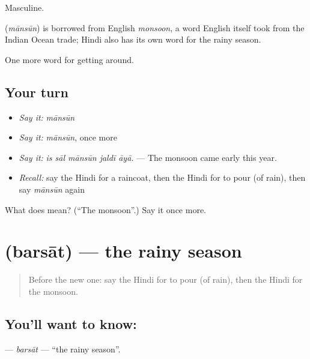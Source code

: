 Masculine.

\begin{cousinweb}
\textbf{} (\emph{mānsūn}) is borrowed from English \emph{monsoon}, a word English itself took from the Indian Ocean trade; Hindi also has its own word for the rainy season.
\end{cousinweb}

\begin{grammarlens}[title={What you've built}]
One more word for getting around.
\end{grammarlens}

\subsection*{Your turn}
\begin{itemize}
\raggedright
  \item \emph{Say it:} \emph{mānsūn}
  \item \emph{Say it:} \emph{mānsūn}, once more
  \item \emph{Say it:} \emph{is sāl mānsūn jaldī āyā.} — The monsoon came early this year.
  \item \emph{Recall:} say the Hindi for a raincoat, then the Hindi for to pour (of rain), then say \emph{mānsūn} again
\end{itemize}

\begin{tcolorbox}[breakable,colback=teal!4,colframe=teal!35!black,title={Before you move on}]
What does  mean? (\textquotedblleft{}The monsoon\textquotedblright{}.) Say it once more.
\end{tcolorbox}
\section[\texorpdfstring{\hi{बरसात} (barsāt)}{बरसात (barsāt)}]{ (barsāt) — the rainy season}

\label{lesson:HI-C437-barsat}



\begin{quote}
Before the new one: say the Hindi for to pour (of rain), then the Hindi for the monsoon.
\end{quote}

\subsection*{You'll want to know: }
\textbf{} — \emph{barsāt} — \textquotedblleft{}the rainy season\textquotedblright{}.

